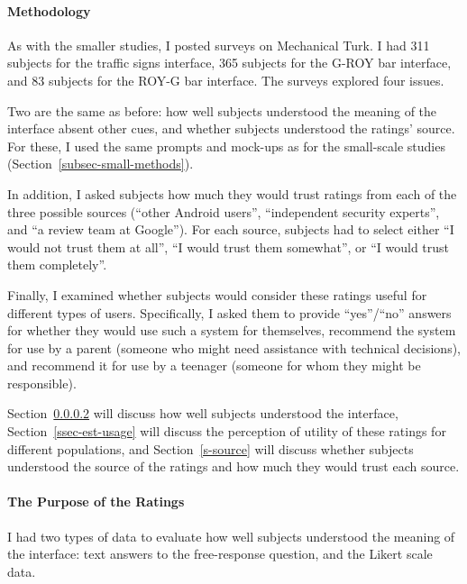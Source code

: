 \documentclass[11pt]{article}
\newcommand{\refsec}[1]{Section~\ref{#1}}
\begin{document}
\paragraph{Methodology}
\label{subsec-large-methods}

As with the smaller studies, I posted surveys on Mechanical
Turk. I had 311 subjects for the traffic signs interface, 365
subjects for the G-ROY bar interface, and 83 subjects for the ROY-G bar
interface. The surveys explored four issues. 

Two are the same
as before: how well subjects understood the meaning of the interface
absent other cues, and whether subjects understood the ratings' source.
For these, I used the same prompts and mock-ups as for the
small-scale studies (\refsec{subsec-small-methods}).

In addition, I asked 
subjects how much they would trust ratings from each
of the three possible sources (``other Android users'', 
``independent security experts'', and ``a review team at Google''). 
For each source, subjects
had to select either ``I would not trust them at all'',
``I would trust them somewhat'', or ``I would trust 
them completely''.

Finally, I examined whether subjects would consider
these ratings useful for different types of users.
Specifically, I asked them to
provide ``yes''/``no'' answers for whether they would 
use such a system for themselves, recommend the system for use by a
parent (someone who might need assistance with technical decisions), and 
recommend it for use
by a teenager (someone for whom they might be
responsible).

\refsec{subsec-subject-understanding} will discuss how well
subjects understood the interface, \refsec{ssec-est-usage} will 
discuss the perception of utility of these ratings for different
populations, and \refsec{s-source} will discuss whether subjects 
understood the source of the ratings and how much they would trust each source.

\paragraph{The Purpose of the Ratings}
\label{subsec-subject-understanding}

I had two types of data to evaluate how well subjects understood
the meaning of the interface: text answers to the free-response 
question, and the Likert scale data.
\end{document}
